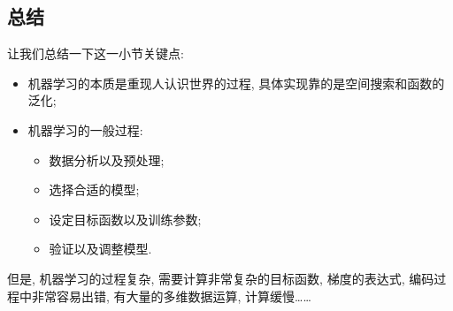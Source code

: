 \subsection{总结}
\begin{frame}{\insertsection}{\insertsubsection}
让我们总结一下这一小节关键点:%
%
\begin{itemize}
\item 机器学习的本质是重现人认识世界的过程, 具体实现靠的是空间搜索和函数的泛化;
\item 机器学习的一般过程:
\begin{itemize}
\item 数据分析以及预处理;
\item 选择合适的模型;
\item 设定目标函数以及训练参数;
\item 验证以及调整模型.
\end{itemize}
\end{itemize}

\pause
但是, 机器学习的过程复杂, 需要计算非常复杂的目标函数, 梯度的表达式, 编码过程中非常容易出错, 有大量的多维数据运算, 计算缓慢……
\end{frame}







